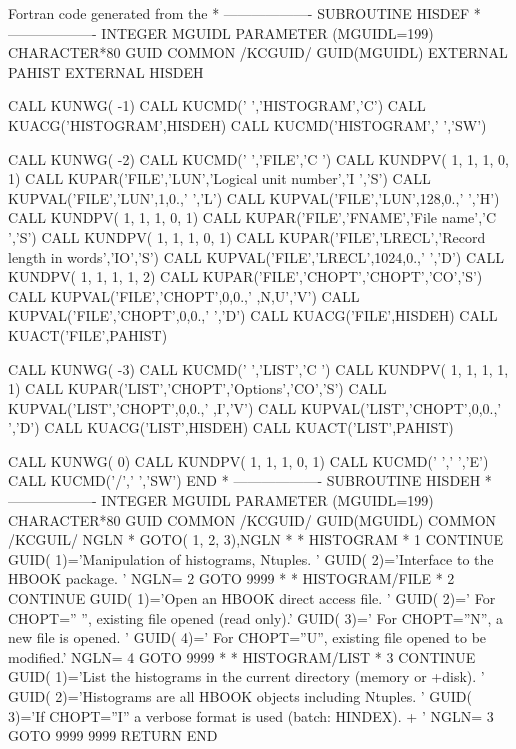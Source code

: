 \begin{XMPtext}{Fortran code generated from the \CDF{}}
*     -------------------
      SUBROUTINE HISDEF
*     -------------------
      INTEGER MGUIDL
      PARAMETER (MGUIDL=199)
      CHARACTER*80 GUID
      COMMON /KCGUID/ GUID(MGUIDL)
      EXTERNAL PAHIST
      EXTERNAL HISDEH
 
      CALL KUNWG(  -1)
      CALL KUCMD(' ','HISTOGRAM','C')
      CALL KUACG('HISTOGRAM',HISDEH)
      CALL KUCMD('HISTOGRAM',' ','SW')
 
      CALL KUNWG(  -2)
      CALL KUCMD(' ','FILE','C ')
      CALL KUNDPV(  1,  1,  1,  0,  1)
      CALL KUPAR('FILE','LUN','Logical unit number','I ','S')
      CALL KUPVAL('FILE','LUN',1,0.,' ','L')
      CALL KUPVAL('FILE','LUN',128,0.,' ','H')
      CALL KUNDPV( 1, 1, 1, 0,  1)
      CALL KUPAR('FILE','FNAME','File name','C ','S')
      CALL KUNDPV(  1,  1,  1,  0,  1)
      CALL KUPAR('FILE','LRECL','Record length in words','IO','S')
      CALL KUPVAL('FILE','LRECL',1024,0.,' ','D')
      CALL KUNDPV( 1, 1, 1, 1,  2)
      CALL KUPAR('FILE','CHOPT','CHOPT','CO','S')
      CALL KUPVAL('FILE','CHOPT',0,0.,' ,N,U','V')
      CALL KUPVAL('FILE','CHOPT',0,0.,' ','D')
      CALL KUACG('FILE',HISDEH)
      CALL KUACT('FILE',PAHIST)
 
      CALL KUNWG(  -3)
      CALL KUCMD(' ','LIST','C ')
      CALL KUNDPV( 1, 1, 1, 1,  1)
      CALL KUPAR('LIST','CHOPT','Options','CO','S')
      CALL KUPVAL('LIST','CHOPT',0,0.,' ,I','V')
      CALL KUPVAL('LIST','CHOPT',0,0.,' ','D')
      CALL KUACG('LIST',HISDEH)
      CALL KUACT('LIST',PAHIST)
 
      CALL KUNWG(   0)
      CALL KUNDPV(   1,   1,   1,   0,   1)
      CALL KUCMD(' ',' ','E')
      CALL KUCMD('/',' ','SW')
      END
*     -------------------
      SUBROUTINE HISDEH
*     -------------------
      INTEGER MGUIDL
      PARAMETER (MGUIDL=199)
      CHARACTER*80 GUID
      COMMON /KCGUID/ GUID(MGUIDL)
      COMMON /KCGUIL/ NGLN
*
      GOTO( 1, 2, 3),NGLN
*
* HISTOGRAM
*
    1 CONTINUE
      GUID( 1)='Manipulation of histograms, Ntuples. '
      GUID( 2)='Interface to the HBOOK package. '
      NGLN=  2
      GOTO 9999
*
* HISTOGRAM/FILE
*
    2 CONTINUE
      GUID( 1)='Open an HBOOK direct access file. '
      GUID( 2)=' For CHOPT='' '', existing file opened (read only).'
      GUID( 3)=' For CHOPT=''N'', a new file is opened. '
      GUID( 4)=' For CHOPT=''U'', existing file opened to be modified.'
      NGLN=  4
      GOTO 9999
*
* HISTOGRAM/LIST
*
    3 CONTINUE
      GUID( 1)='List the histograms in the current directory (memory or
     +disk). '
      GUID( 2)='Histograms are all HBOOK objects including Ntuples. '
      GUID( 3)='If CHOPT=''I'' a verbose format is used (batch: HINDEX).
     + '
      NGLN=  3
      GOTO 9999
9999  RETURN
      END
\end{XMPtext}
%
%
\fi
\fi

